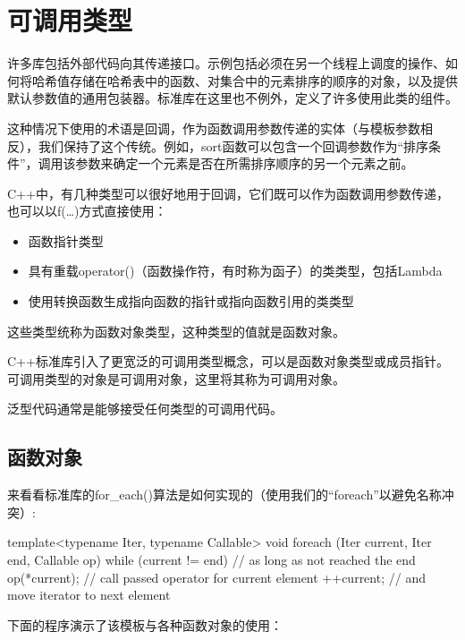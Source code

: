 \section{可调用类型}

许多库包括外部代码向其传递接口。示例包括必须在另一个线程上调度的操作、如何将哈希值存储在哈希表中的函数、对集合中的元素排序的顺序的对象，以及提供默认参数值的通用包装器。标准库在这里也不例外，定义了许多使用此类的组件。

这种情况下使用的术语是回调，作为函数调用参数传递的实体（与模板参数相反），我们保持了这个传统。例如，sort函数可以包含一个回调参数作为“排序条件”，调用该参数来确定一个元素是否在所需排序顺序的另一个元素之前。

C++中，有几种类型可以很好地用于回调，它们既可以作为函数调用参数传递，也可以以f(…)方式直接使用：

\begin{itemize}
\item
函数指针类型

\item
具有重载operator()（函数操作符，有时称为函子）的类类型，包括Lambda

\item
使用转换函数生成指向函数的指针或指向函数引用的类类型
\end{itemize}

这些类型统称为函数对象类型，这种类型的值就是函数对象。

C++标准库引入了更宽泛的可调用类型概念，可以是函数对象类型或成员指针。可调用类型的对象是可调用对象，这里将其称为可调用对象。

泛型代码通常是能够接受任何类型的可调用代码。

\subsection{函数对象}

来看看标准库的for\_each()算法是如何实现的（使用我们的“foreach”以避免名称冲突）:

\begin{cpp}
template<typename Iter, typename Callable>
void foreach (Iter current, Iter end, Callable op)
{
	while (current != end) { // as long as not reached the end
		op(*current); // call passed operator for current element
		++current; // and move iterator to next element
	}
}
\end{cpp}

下面的程序演示了该模板与各种函数对象的使用：

